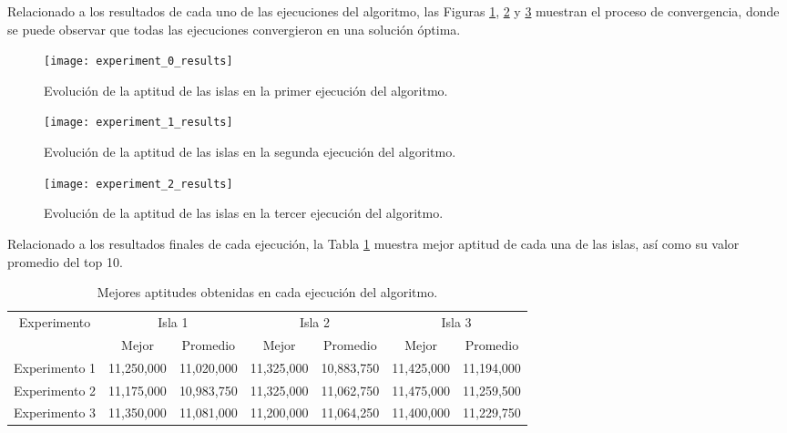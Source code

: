 Relacionado a los resultados de cada uno de las ejecuciones del algoritmo, las Figuras \ref{fig:AG_1}, \ref{fig:AG_2} y \ref{fig:AG_3} muestran el proceso de convergencia, donde se puede observar que todas las ejecuciones convergieron en una solución óptima.

\begin{figure}[htbp]
	\centering
	\texttt{[image: experiment\_0\_results]}
	\caption{Evolución de la aptitud de las islas en la primer ejecución del algoritmo.}
	\label{fig:AG_1}
\end{figure}

\begin{figure}[htbp]
	\centering
	\texttt{[image: experiment\_1\_results]}
	\caption{Evolución de la aptitud de las islas en la segunda ejecución del algoritmo.}
	\label{fig:AG_2}
\end{figure}

\begin{figure}[htbp]
	\centering
	\texttt{[image: experiment\_2\_results]}
	\caption{Evolución de la aptitud de las islas en la tercer ejecución del algoritmo.}
	\label{fig:AG_3}
\end{figure}

\FloatBarrier
Relacionado a los resultados finales de cada ejecución, la Tabla \ref{tab:resultados} muestra mejor aptitud de cada una de las islas, así como su valor promedio del top 10.

\begin{table}[htbp]
\centering
\caption{Mejores aptitudes obtenidas en cada ejecución del algoritmo.}
\begin{tabular}{ccccccc}
\hline
\multirow{2}{*}{Experimento} & \multicolumn{2}{c}{Isla 1} & \multicolumn{2}{c}{Isla 2} & \multicolumn{2}{c}{Isla 3} \\ \cline{2-7} 
                             & Mejor        & Promedio    & Mejor        & Promedio    & Mejor        & Promedio    \\ \hline
Experimento 1                & 11,250,000   & 11,020,000  & 11,325,000   & 10,883,750  & 11,425,000   & 11,194,000  \\
Experimento 2                & 11,175,000   & 10,983,750  & 11,325,000   & 11,062,750  & 11,475,000   & 11,259,500  \\
Experimento 3                & 11,350,000   & 11,081,000  & 11,200,000   & 11,064,250  & 11,400,000   & 11,229,750  \\ \hline
\end{tabular}
\label{tab:resultados}
\end{table}